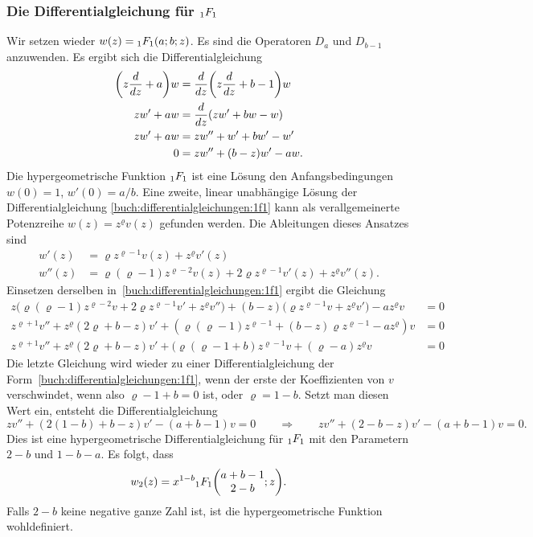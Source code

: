 \subsubsection{Die Differentialgleichung für $\mathstrut_1F_1$}
Wir setzen wieder $w(z) = \mathstrut_1F_1(a;b;z)$.
Es sind die Operatoren $D_a$ und $D_{b-1}$ anzuwenden.
Es ergibt sich die Differentialgleichung
\begin{align}
\biggl(z\frac{d}{dz}+a\biggr)w
&=
\frac{d}{dz}\biggl(z\frac{d}{dz} +b-1\biggr)w
\notag
\\
zw'+a w
&=
\frac{d}{dz}
(zw'+b w - w)
\notag
\\
zw'+a w
&=
zw'' +w'+b w' - w'
\notag
\\
0
&=
zw'' + (b - z)w' - a w.
\label{buch:differentialgleichungen:1f1}
\end{align}
Die hypergeometrische Funktion $\mathstrut_1F_1$ ist eine Lösung 
den Anfangsbedingungen $w(0)=1$, $w'(0)=a/b$.
Eine zweite, linear unabhängige Lösung der Differentialgleichung
\eqref{buch:differentialgleichungen:1f1} kann als verallgemeinerte
Potenzreihe $w(z) = z^\varrho v(z)$ gefunden werden.
Die Ableitungen dieses Ansatzes sind
\begin{align*}
w'(z) 
&=
\varrho z^{\varrho-1} v(z) + z^\varrho v'(z)
\\
w''(z)
&=
\varrho(\varrho-1) z^{\varrho-2} v(z)
+
2\varrho z^{\varrho-1} v'(z)
+
z^\varrho v''(z).
\end{align*}
Einsetzen derselben in~\eqref{buch:differentialgleichungen:1f1}
ergibt die Gleichung
\begin{align*}
z\bigl(
\varrho(\varrho-1)z^{\varrho-2}v + 2\varrho z^{\varrho-1}v'+z^\varrho v''
\bigr)
+
(b-z)\bigl(\varrho z^{\varrho-1}v+z^\varrho v'\bigr)
-
a z^\varrho v
&=
0
\\
z^{\varrho+1} v''
+
z^\varrho
(2\varrho + b-z)
v'
+
(\varrho(\varrho-1)z^{\varrho-1}
+(b-z)
\varrho
z^{\varrho-1}
-
az^\varrho
)
v
&=
0
\\
z^{\varrho+1} v''
+
z^\varrho(2\varrho+b-z)v'
+
(\varrho(\varrho-1+b) z^{\varrho-1} v
+
(\varrho-a)z^\varrho v
&=
0
\end{align*}
Die letzte Gleichung wird wieder zu einer Differentialgleichung
der Form~\eqref{buch:differentialgleichungen:1f1}, wenn der erste
der Koeffizienten von $v$ verschwindet, wenn also 
$\varrho-1+b=0$ ist, oder $\varrho=1-b$.
Setzt man diesen Wert ein, entsteht die Differentialgleichung
\[
zv'' + (2(1-b)+b-z) v' - (a+b-1)v = 0
\qquad\Rightarrow\qquad
zv'' + (2-b-z) v' - (a+b-1)v = 0.
\]
Dies ist eine hypergeometrische Differentialgleichung für
$\mathstrut_1F_1$ mit den Parametern $2-b$ und $1-b-a$.
Es folgt, dass 
\[
w_2(z)
=
x^{1-b} \mathstrut_1F_1\biggl(
\begin{matrix}
a+b-1\\
2-b
\end{matrix}
;z
\biggr).
\]
Falls $2-b$ keine negative ganze Zahl ist, ist die hypergeometrische
Funktion wohldefiniert.

